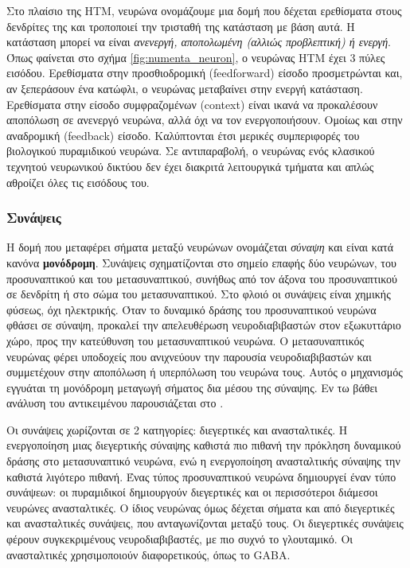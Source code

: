 	Στο πλαίσιο της HTM, νευρώνα ονομάζουμε μια δομή που δέχεται ερεθίσματα στους δενδρίτες της και τροποποιεί την τρισταθή της κατάσταση με βάση αυτά.
	Η κατάσταση μπορεί να είναι \textit{ανενεργή, αποπολωμένη (αλλιώς προβλεπτική) ή ενεργή}.
	Όπως φαίνεται στο σχήμα \ref{fig:numenta_neuron}, ο νευρώνας HTM έχει 3 πύλες εισόδου.
	Ερεθίσματα στην προσθιοδρομική (feedforward) είσοδο προσμετρώνται και, αν ξεπεράσουν ένα κατώφλι, ο νευρώνας μεταβαίνει στην ενεργή κατάσταση.
	Ερεθίσματα στην είσοδο συμφραζομένων (context) είναι ικανά να προκαλέσουν αποπόλωση σε ανενεργό νευρώνα, αλλά όχι να τον ενεργοποιήσουν.
	Ομοίως και στην αναδρομική (feedback) είσοδο.
	Καλύπτονται έτσι μερικές συμπεριφορές του βιολογικού πυραμιδικού νευρώνα.
	Σε αντιπαραβολή, ο νευρώνας ενός κλασικού τεχνητού νευρωνικού δικτύου δεν έχει διακριτά λειτουργικά τμήματα και απλώς αθροίζει όλες τις εισόδους του.

	\subsubsection{Συνάψεις}

	Η δομή που μεταφέρει σήματα μεταξύ νευρώνων ονομάζεται \textit{σύναψη} και είναι κατά κανόνα \textbf{μονόδρομη}.
	Συνάψεις σχηματίζονται στο σημείο επαφής δύο νευρώνων, του προσυναπτικού και του μετασυναπτικού, συνήθως από τον άξονα του προσυναπτικού σε δενδρίτη ή στο σώμα του μετασυναπτικού.
	Στο φλοιό οι συνάψεις είναι χημικής φύσεως, όχι ηλεκτρικής.
	Όταν το δυναμικό δράσης του προσυναπτικού νευρώνα φθάσει σε σύναψη, προκαλεί την απελευθέρωση νευροδιαβιβαστών στον εξωκυττάριο χώρο,
	προς την κατεύθυνση του μετασυναπτικού νευρώνα.
	Ο μετασυναπτικός νευρώνας φέρει υποδοχείς που ανιχνεύουν την παρουσία νευροδιαβιβαστών και συμμετέχουν στην αποπόλωση ή υπερπόλωση του νευρώνα τους.
	Αυτός ο μηχανισμός εγγυάται τη μονόδρομη μεταγωγή σήματος δια μέσου της σύναψης.
	Εν τω βάθει ανάλυση του αντικειμένου παρουσιάζεται στο \cite{kandelPrinciplesNeuralScience2013}.

	Οι συνάψεις χωρίζονται σε 2 κατηγορίες: διεγερτικές και ανασταλτικές.
	Η ενεργοποίηση μιας διεγερτικής σύναψης καθιστά πιο πιθανή την πρόκληση δυναμικού δράσης στο μετασυναπτικό νευρώνα,
	ενώ η ενεργοποίηση ανασταλτικής σύναψης την καθιστά λιγότερο πιθανή.
	Ένας τύπος προσυναπτικού νευρώνα δημιουργεί έναν τύπο συνάψεων: οι πυραμιδικοί δημιουργούν διεγερτικές και οι περισσότεροι διάμεσοι νευρώνες ανασταλτικές.
	Ο ίδιος νευρώνας όμως δέχεται σήματα και από διεγερτικές και ανασταλτικές συνάψεις, που ανταγωνίζονται μεταξύ τους.
	Οι διεγερτικές συνάψεις φέρουν συγκεκριμένους νευροδιαβιβαστές, με πιο συχνό το γλουταμικό.
	Οι ανασταλτικές χρησιμοποιούν διαφορετικούς, όπως το GABA.

